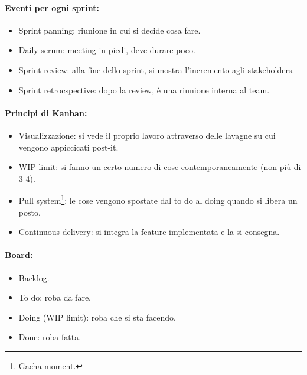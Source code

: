 \paragraph{Eventi per ogni sprint:}

\begin{itemize}
	\item Sprint panning: riunione in cui si decide cosa fare.
	\item Daily scrum: meeting in piedi, deve durare poco.
	\item Sprint review: alla fine dello sprint, si mostra l'incremento agli stakeholders.
	\item Sprint retrocspective: dopo la review, è una riunione interna al team.
\end{itemize}


\paragraph{Principi di Kanban:}

\begin{itemize}
	\item Visualizzazione: si vede il proprio lavoro attraverso delle lavagne su cui vengono appiccicati post-it.
	\item WIP limit: si fanno un certo numero di cose contemporaneamente (non più di 3-4).
	\item Pull system\footnote{Gacha moment.}: le cose vengono spostate dal to do al doing quando si libera un posto.
	\item Continuous delivery: si integra la feature implementata e la si consegna.
\end{itemize}

\paragraph{Board:}

\begin{itemize}
	\item Backlog.
	\item To do: roba da fare.
	\item Doing (WIP limit): roba che si sta facendo.
	\item Done: roba fatta.
\end{itemize}



